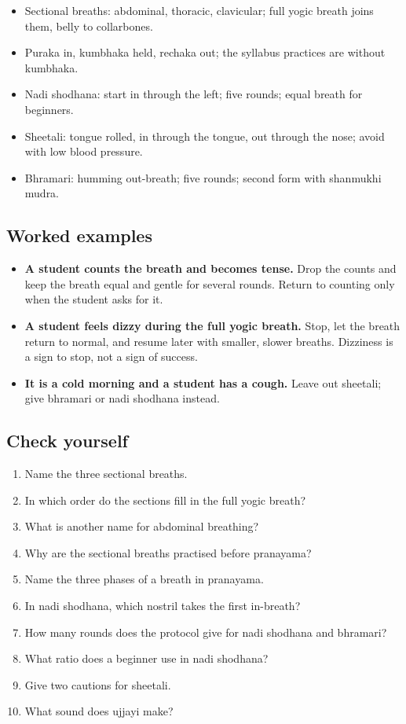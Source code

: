 \begin{recall}
\begin{itemize}
\item Sectional breaths: abdominal, thoracic, clavicular; full yogic breath joins them, belly to collarbones.
\item Puraka in, kumbhaka held, rechaka out; the syllabus practices are without kumbhaka.
\item Nadi shodhana: start in through the left; five rounds; equal breath for beginners.
\item Sheetali: tongue rolled, in through the tongue, out through the nose; avoid with low blood pressure.
\item Bhramari: humming out-breath; five rounds; second form with shanmukhi mudra.
\end{itemize}
\end{recall}

\subsection*{Worked examples}
\begin{itemize}
\item \textbf{A student counts the breath and becomes tense.} Drop the counts and keep the breath equal and gentle for several rounds. Return to counting only when the student asks for it.
\item \textbf{A student feels dizzy during the full yogic breath.} Stop, let the breath return to normal, and resume later with smaller, slower breaths. Dizziness is a sign to stop, not a sign of success.
\item \textbf{It is a cold morning and a student has a cough.} Leave out sheetali; give bhramari or nadi shodhana instead.
\end{itemize}

\subsection*{Check yourself}
\begin{enumerate}
\item Name the three sectional breaths.
\item In which order do the sections fill in the full yogic breath?
\item What is another name for abdominal breathing?
\item Why are the sectional breaths practised before pranayama?
\item Name the three phases of a breath in pranayama.
\item In nadi shodhana, which nostril takes the first in-breath?
\item How many rounds does the protocol give for nadi shodhana and bhramari?
\item What ratio does a beginner use in nadi shodhana?
\item Give two cautions for sheetali.
\item What sound does ujjayi make?
\end{enumerate}

